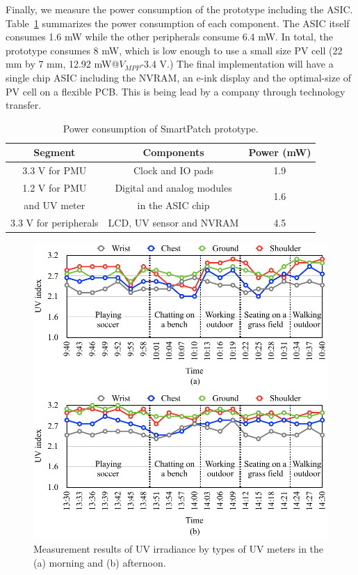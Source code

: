 \documentclass[journal]{IEEEtran}
\begin{document}
Finally, we measure the power consumption of the prototype including the ASIC.
Table~\ref{table:power_summary} summarizes the power consumption of each component.
The ASIC itself consumes 1.6 mW while the other peripherals consume 6.4 mW.
In total, the prototype consumes 8 mW, which is low enough to use a small size PV cell (22 mm by 7 mm, 12.92 mW@$V_{MPP}$-3.4 V.)
%
The final implementation will have a single chip ASIC including the NVRAM, an e-ink display and the optimal-size of PV cell on a flexible PCB. This is being lead by a company through technology transfer.

\begin{table}
\centering
\caption{Power consumption of SmartPatch prototype.}
\label{table:power_summary}
\begin{tabular}{|c|c|c|}  \hline
Segment 			&Components					&Power (mW)	\\ \hline \hline
3.3 V for PMU		&Clock and IO pads			&1.9	\\ \hline
1.2 V for PMU 		&Digital and analog modules		&\multirow{2}{*}{1.6}		\\
and UV meter 	&in the ASIC chip 				&\\ \hline
3.3 V for peripherals & LCD, UV sensor and NVRAM	&4.5 \\ \hline

\end{tabular}
\end{table}

\begin{figure}
\centering
\includegraphics[width=1.0\hsize]{Figures/UV_measure.pdf}
\caption{Measurement results of UV irradiance by types of UV meters in the (a) morning and (b) afternoon.}
\label{fig:UV_measure}
\end{figure}
\end{document}
